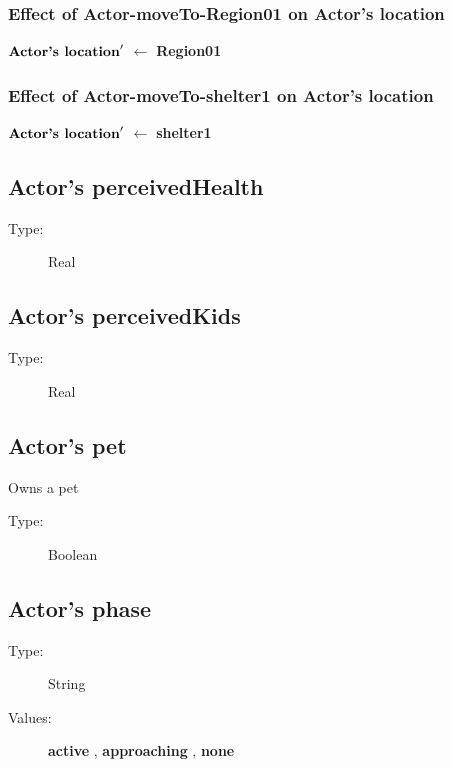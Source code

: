 \documentclass{article}%
\begin{document}
%
\subsubsection{Effect of Actor{-}moveTo{-}Region01 on Actor's location}%
\label{ssubsec:Effect of Actor{-}moveTo{-}Region01 on Actor's location}%
\begin{flushleft}%
$\mbox{\textbf{Actor's location}} '$%
$\leftarrow$%
\textbf{Region01}%
\end{flushleft}

%
\subsubsection{Effect of Actor{-}moveTo{-}shelter1 on Actor's location}%
\label{ssubsec:Effect of Actor{-}moveTo{-}shelter1 on Actor's location}%
\begin{flushleft}%
$\mbox{\textbf{Actor's location}} '$%
$\leftarrow$%
\textbf{shelter1}%
\end{flushleft}

%
\subsection{Actor's perceivedHealth}%
\label{subsec:Actor's perceivedHealth}%
\begin{description}%
\item[Type:]%
Real%
\end{description}

%
\subsection{Actor's perceivedKids}%
\label{subsec:Actor's perceivedKids}%
\begin{description}%
\item[Type:]%
Real%
\end{description}

%
\subsection{Actor's pet}%
\label{subsec:Actor's pet}%
Owns a pet%
\begin{description}%
\item[Type:]%
Boolean%
\end{description}

%
\subsection{Actor's phase}%
\label{subsec:Actor's phase}%
\begin{description}%
\item[Type:]%
String%
\item[Values:]%
\textbf{active}%
, %
\textbf{approaching}%
, %
\textbf{none}%
\end{description}
\end{document}

